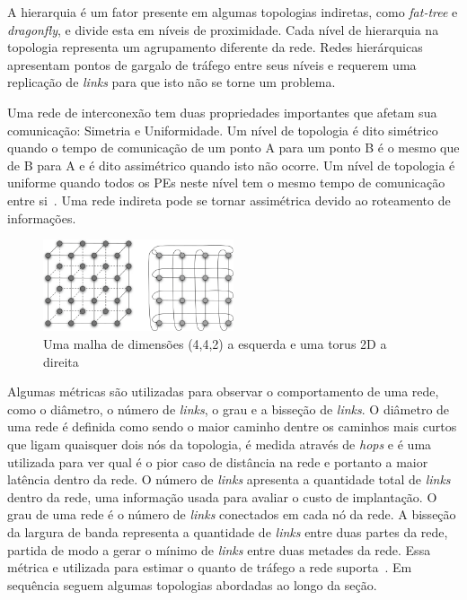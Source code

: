 \documentclass[
	12pt,				%
	openright,			%
	twoside,			%
	a4paper,			%
	english,			%
	brazil,				%
	]{abntex2}
\newcommand{\links}{\textit{links}\xspace}
\newcommand{\hops}{\textit{hops}\xspace}
\newcommand{\fatt}{\textit{fat-tree}\xspace}
\newcommand{\dgfly}{\textit{dragonfly}\xspace}
\begin{document}
A hierarquia é um fator presente em algumas topologias indiretas, como \fatt e \dgfly, e divide esta em níveis de proximidade. 
Cada nível de hierarquia na topologia representa um agrupamento diferente da rede. 
Redes hierárquicas apresentam pontos de gargalo de tráfego entre seus níveis e requerem uma replicação de \links para que isto não se torne um problema.

Uma rede de interconexão tem duas propriedades importantes que afetam sua comunicação: Simetria e Uniformidade. 
Um nível de topologia é dito simétrico quando o tempo de comunicação de um ponto A para um ponto B é o mesmo que de B para A e é dito assimétrico quando isto não ocorre. 
Um nível de topologia é uniforme quando todos os PEs neste nível tem o mesmo tempo de comunicação entre si~\cite{pilla-thesis}. 
Uma rede indireta pode se tornar assimétrica devido ao roteamento de informações. 

\begin{figure} [b]
\includegraphics[width=0.5\textwidth]{mesh_torus}
\centering
\caption[Uma malha de dimensões (4,4,2) e uma torus 2D]{Uma malha de dimensões (4,4,2) a esquerda e uma torus 2D a direita~\cite{bhatele-encyclopedia}}
\label{fig:mesh_torus}
\end{figure}

Algumas métricas são utilizadas para observar o comportamento de uma rede, como o diâmetro, o número de \links, o grau e a bisseção de \links. 
O diâmetro de uma rede é definida como sendo o maior caminho dentre os caminhos mais curtos que ligam quaisquer dois nós da topologia, é medida através de \hops e é uma utilizada para ver qual é o pior caso de distância na rede e portanto a maior latência dentro da rede. 
O número de \links apresenta a quantidade total de \links dentro da rede, uma informação usada para avaliar o custo de implantação. 
O grau de uma rede é o número de \links conectados em cada nó da rede. 
A bisseção da largura de banda representa a quantidade de \links entre duas partes da rede, partida de modo a gerar o mínimo de \links entre duas metades da rede. 
Essa métrica e utilizada para estimar o quanto de tráfego a rede suporta~\cite{david:paralel}. 
Em sequência seguem algumas topologias abordadas ao longo da seção.
\end{document}
